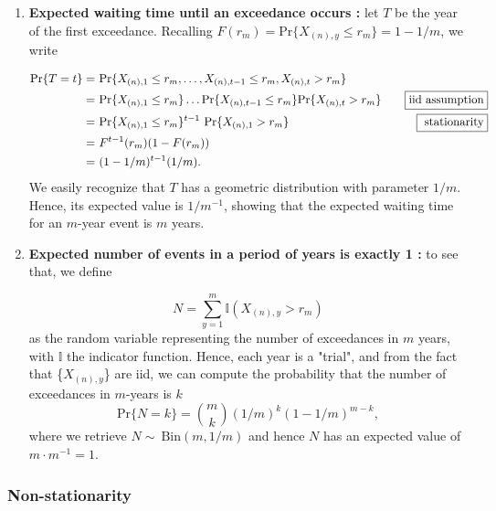 \begin{enumerate}
	\item \textbf{Expected waiting time until an exceedance occurs :} let $T$ be the year of the first exceedance. Recalling $F(r_m) = \text{Pr} \big\{X_{(n),y}\leq r_m\big\}=1-1/m$, we write
	
	\begin{equation*}
	\begin{aligned}
	\text{Pr}\{T=t\}=\  & \text{Pr}\{X_{(n),1}\leq r_m,\dots,X_{(n),t-1}\leq r_m,X_{(n),t}>r_m\} \\
	=\ & \text{Pr}\{X_{(n),1}\leq r_m\}\dots\text{Pr}\{X_{(n),t-1}\leq r_m\}\text{Pr}\{X_{(n),t}>r_m\}&  \quad  \boxed{\textnormal{iid assumption}}\\
	= \ & \text{Pr}\{X_{(n),1}\leq r_m\}^{t-1}\ \text{Pr}\{X_{(n),1}>r_m\} &  \quad \boxed{\text{ stationarity}}\\
	=\ & F^{t-1}(r_m)(1-F(r_m))\\
	=\ & (1-1/m)^{t-1}(1/m).
	\end{aligned}
	\end{equation*}
	We easily recognize that $T$ has a geometric distribution with parameter $1/m$. Hence, its expected value is $1/m^{-1}$, showing that the expected waiting time for an $m$-year event is $m$ years.
	
	\item \textbf{Expected number of events in a period of  years is exactly 1 :} to see that, we define  
	
	\begin{equation*}N=\sum_{y=1}^m \mathbb{I}(X_{(n),y}>r_m)
	\end{equation*}
	as the random variable representing the number of exceedances in $m$ years, with $\mathbb{I}$ the indicator function. Hence, each year is a "trial", and from the fact that \big\{$X_{(n),y}$\big\} are iid, we can compute the probability that the number of exceedances in $m$-years is $k$
	\begin{equation*}
	\text{Pr}\{N=k\}=\binom{m}{k}(1/m)^k(1-1/m)^{m-k},
	\end{equation*}
	where we retrieve $N\sim \ \text{Bin}(m,1/m)$ and hence $N$ has an expected value of $m\cdot m^{-1}=1$.
	
\end{enumerate}


\subsubsection*{Non-stationarity}

